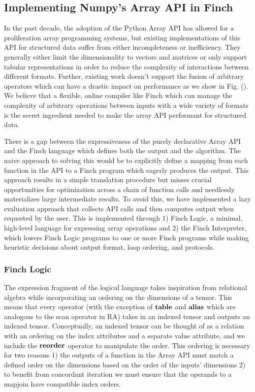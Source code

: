 \subsection{Implementing Numpy's Array API in Finch}
In the past decade, the adoption of the Python Array API \cite{harris_array_2020} has allowed for a proliferation array programming systems, but existing implementations of this API for structured data suffer from either incompleteness or inefficiency. They generally either limit the dimensionality to vectors and matrices or only support tabular representations in order to reduce the complexity of interactions between different formats. Further, existing work doesn't support the fusion of arbitrary operators which can have a drastic impact on performance as we show in Fig. (). We believe that a flexible, online compiler like Finch which can manage the complexity of arbitrary operations between inputs with a wide variety of formats is the secret ingredient needed to make the array API performant for structured data.

There is a gap between the expressiveness of the purely declarative Array API and the Finch language which defines both the output and the algorithm. The naive approach to solving this would be to explicitly define a mapping from each function in the API to a Finch program which eagerly produces the output. This approach results in a simple translation procedure but misses crucial opportunities for optimization across a chain of function calls and needlessly materializes large intermediate results. To avoid this, we have implemented a lazy evaluation approach that collects API calls and then computes output when requested by the user. This is implemented through 1) Finch Logic, a minimal, high-level language for expressing array operations and 2) the Finch Interpreter, which lowers Finch Logic programs to one or more Finch programs while making heuristic decisions about output format, loop ordering, and protocols.

\subsubsection{Finch Logic}
The expression fragment of the logical language takes inspiration from relational algebra while incorporating an ordering on the dimensions of a tensor. This means that every operator (with the exception of $\text{\textbf{table}}$ and $\text{\textbf{alias}}$ which are analogous to the scan operator in RA) takes in an indexed tensor and outputs an indexed tensor. Conceptually, an indexed tensor can be thought of as a relation with an ordering on the index attributes and a separate value attribute, and we include the $\text{\textbf{reorder}}$ operator to manipulate the order. This ordering is necessary for two reasons 1) the outputs of a function in the Array API must match a defined order on the dimensions based on the order of the inputs' dimensions 2) to benefit from concordant iteration we must ensure that the operands to a mapjoin have compatible index orders.

